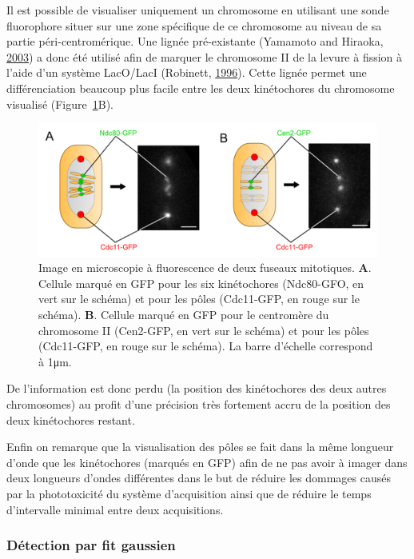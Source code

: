 \documentclass[12pt,a4paper,twoside,openright]{book}
\begin{document}
Il est possible de visualiser uniquement un chromosome en utilisant une
sonde fluorophore situer sur une zone spécifique de ce chromosome au
niveau de sa partie péri-centromérique. Une lignée pré-existante
(Yamamoto and Hiraoka, \hyperref[ref-Yamamoto2003]{2003}) a donc été
utilisé afin de marquer le chromosome II de la levure à fission à l'aide
d'un système LacO/LacI (Robinett, \hyperref[ref-Robinett1996]{1996}).
Cette lignée permet une différenciation beaucoup plus facile entre les
deux kinétochores du chromosome visualisé
(Figure~\ref{fig:spindle_peaks}B).

\begin{figure}[htbp]
\centering
\includegraphics{figures/results/imaging/spindle_peaks.png}
\caption[Image en microscopie à fluorescence de deux fuseaux mitotique]{\label{fig:spindle_peaks}Image
en microscopie à fluorescence de deux fuseaux mitotiques. \textbf{A}.
Cellule marqué en GFP pour les six kinétochores (Ndc80-GFO, en vert sur
le schéma) et pour les pôles (Cdc11-GFP, en rouge sur le schéma).
\textbf{B}. Cellule marqué en GFP pour le centromère du chromosome II
(Cen2-GFP, en vert sur le schéma) et pour les pôles (Cdc11-GFP, en rouge
sur le schéma). La barre d'échelle correspond à 1μm.}
\end{figure}

De l'information est donc perdu (la position des kinétochores des deux
autres chromosomes) au profit d'une précision très fortement accru de la
position des deux kinétochores restant.

Enfin on remarque que la visualisation des pôles se fait dans la même
longueur d'onde que les kinétochores (marqués en GFP) afin de ne pas
avoir à imager dans deux longueurs d'ondes différentes dans le but de
réduire les dommages causés par la phototoxicité du système
d'acquisition ainsi que de réduire le temps d'intervalle minimal entre
deux acquisitions.

\subsubsection{Détection par fit
gaussien}\label{duxe9tection-par-fit-gaussien}
\end{document}
